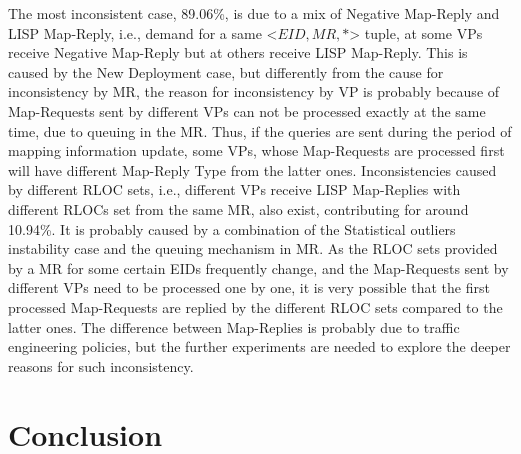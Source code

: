 The most inconsistent case, 89.06\%, is due to a mix of Negative Map-Reply and LISP Map-Reply, i.e., demand for a same <$EID, MR, *$> tuple, at some VPs receive Negative Map-Reply but at others receive LISP Map-Reply. This is caused by the New Deployment case, but differently from the cause for inconsistency by MR, the reason for inconsistency by VP is probably because of Map-Requests sent by different VPs can not be processed exactly at the same time, due to queuing in the MR. Thus, if the queries are sent during the period of mapping information update, some VPs, whose Map-Requests are processed first will have different Map-Reply Type from the latter ones. Inconsistencies caused by different RLOC sets, i.e., different VPs receive LISP Map-Replies with different RLOCs set from the same MR, also exist, contributing for around 10.94\%. It is probably caused by a combination of the Statistical outliers instability case and the queuing mechanism in MR. As the RLOC sets provided by a MR for some certain EIDs frequently change, and the Map-Requests sent by different VPs need to be processed one by one, it is very possible that the first processed Map-Requests are replied by the different RLOC sets compared to the latter ones. The difference between Map-Replies is probably due to traffic engineering policies, but the further experiments are needed to explore the deeper reasons for such inconsistency.



\section{Conclusion}
\label{sec:mds_conclusion}


